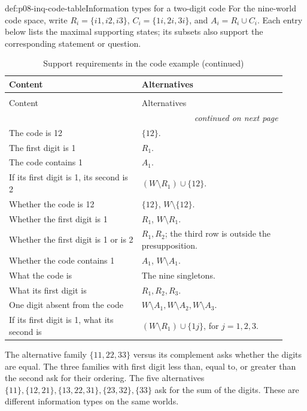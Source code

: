 \begin{hbexample}{def:p08-inq-code-table}{Information types for a two-digit code}
For the nine-world code space, write \(R_i=\{i1,i2,i3\}\),
\(C_i=\{1i,2i,3i\}\), and \(A_i=R_i\cup C_i\).
Each entry below lists the maximal supporting states; its subsets also
support the corresponding statement or question.
\begin{longtable}{@{}p{0.44\linewidth}p{0.48\linewidth}@{}}
\caption{Support requirements in the code example}\label{tab:p08-inq-code}\\
\hline Content & Alternatives \\\hline\endfirsthead
\caption[]{Support requirements in the code example (continued)}\\
\hline Content & Alternatives \\\hline\endhead
\hline\multicolumn{2}{r}{\emph{continued on next page}}\\
\endfoot
\endlastfoot
The code is 12 & \(\{12\}\). \\
The first digit is 1 & \(R_1\). \\
The code contains 1 & \(A_1\). \\
If its first digit is 1, its second is 2 & \((W\setminus R_1)\cup\{12\}\). \\
Whether the code is 12 & \(\{12\}\), \(W\setminus\{12\}\). \\
Whether the first digit is 1 & \(R_1\), \(W\setminus R_1\). \\
Whether the first digit is 1 or is 2 & \(R_1,R_2\); the third row is outside the presupposition. \\
Whether the code contains 1 & \(A_1\), \(W\setminus A_1\). \\
What the code is & The nine singletons. \\
What its first digit is & \(R_1,R_2,R_3\). \\
One digit absent from the code & \(W\setminus A_1,W\setminus A_2,W\setminus A_3\). \\
If its first digit is 1, what its second is & \((W\setminus R_1)\cup\{1j\}\), for \(j=1,2,3\). \\
\hline
\end{longtable}
The alternative family \(\{11,22,33\}\) versus its complement asks whether
the digits are equal. The three families with first digit less than, equal
to, or greater than the second ask for their ordering. The five alternatives
\(\{11\},\{12,21\},\{13,22,31\},\{23,32\},\{33\}\) ask for the
sum of the digits. These are different information types on the same worlds.
\end{hbexample}

